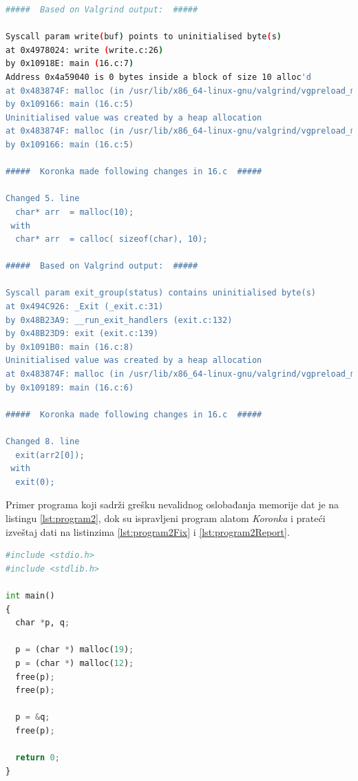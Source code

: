 \documentclass[12pt,oneside]{memoir}
\theoremstyle{plain}
\theoremstyle{definition}
\begin{document}
\begin{lstlisting}[style=terminal,caption={Izveštaj o radu alata \textit{Koronka} za program sa listinga \ref{lst:program1}}, label={lst:program1Report},language={bash}]   
#####  Based on Valgrind output:  #####

Syscall param write(buf) points to uninitialised byte(s)
at 0x4978024: write (write.c:26)
by 0x10918E: main (16.c:7)
Address 0x4a59040 is 0 bytes inside a block of size 10 alloc'd
at 0x483874F: malloc (in /usr/lib/x86_64-linux-gnu/valgrind/vgpreload_memcheck-amd64-linux.so)
by 0x109166: main (16.c:5)
Uninitialised value was created by a heap allocation
at 0x483874F: malloc (in /usr/lib/x86_64-linux-gnu/valgrind/vgpreload_memcheck-amd64-linux.so)
by 0x109166: main (16.c:5)

#####  Koronka made following changes in 16.c  #####

Changed 5. line 
  char* arr  = malloc(10);
 with 
  char* arr  = calloc( sizeof(char), 10);

#####  Based on Valgrind output:  #####

Syscall param exit_group(status) contains uninitialised byte(s)
at 0x494C926: _Exit (_exit.c:31)
by 0x48B23A9: __run_exit_handlers (exit.c:132)
by 0x48B23D9: exit (exit.c:139)
by 0x1091B0: main (16.c:8)
Uninitialised value was created by a heap allocation
at 0x483874F: malloc (in /usr/lib/x86_64-linux-gnu/valgrind/vgpreload_memcheck-amd64-linux.so)
by 0x109189: main (16.c:6)

#####  Koronka made following changes in 16.c  #####

Changed 8. line 
  exit(arr2[0]);
 with 
  exit(0);
\end{lstlisting}

Primer programa koji sadrži grešku nevalidnog oslobađanja memorije dat je na listingu \ref{lst:program2}, dok su ispravljeni program alatom \textit{Koronka} i prateći izveštaj dati na listinzima \ref{lst:program2Fix} i \ref{lst:program2Report}.

\begin{lstlisting}[style=mystyle,caption={Program koji sadrži grešku nevalidnog oslobađanja memorije}, label={lst:program2},language={Python}] 
#include <stdio.h>
#include <stdlib.h>

int main()
{
  char *p, q;

  p = (char *) malloc(19);
  p = (char *) malloc(12);
  free(p);
  free(p);

  p = &q;
  free(p); 			
  				
  return 0;
}
\end{lstlisting}
\end{document}
